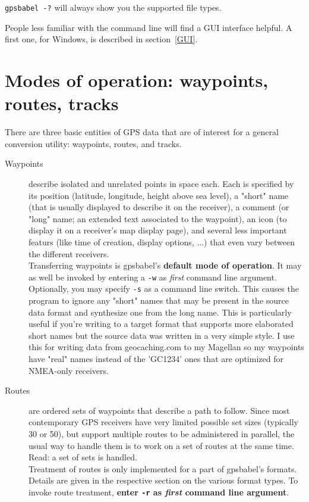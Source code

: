 \documentclass[12pt]{article}
\newcommand{\gpsbabel}{{\sc gpsbabel}}
\begin{document}
\bigskip

{\tt \small gpsbabel -?} will always show you the supported file types.

\bigskip

People less familiar with the command line will find a GUI interface helpful. A first one, for Windows, is described in section~\ref{GUI}.



\section{Modes of operation: waypoints, routes, tracks}

There are three basic entities of GPS data that are of interest for a general conversion utility: waypoints, routes, and tracks.

\begin{description}

\item[Waypoints] describe isolated and unrelated points in space each. Each is specified by its position (latitude, longitude, height above sea level), a "short" name (that is usually displayed to describe it on the receiver), a comment (or "long" name; an extended text associated to the waypoint), an icon (to display it on a receiver's map display page), and several less important featurs (like time of creation, display options, ...) that even vary between the different receivers.\\
Transferring waypoints is \gpsbabel 's {\bfseries default mode of operation}. It may as well be invoked by entering a {\tt -w} as {\em first} command line argument.\\
Optionally, you may specify {\tt -s} as a command line switch.  This causes the program to ignore any "short" names that may be present in the source data format and synthesize one from the long name.  This is particularly useful if you're writing to a target format that 
supports more elaborated short names but the source data was written in a very simple style.  I use this for writing data from geocaching.com to my Magellan so my waypoints have "real" names instead of the 'GC1234' ones that are optimized for NMEA-only 
receivers.

\item[Routes] are ordered sets of waypoints that describe a path to follow. Since most contemporary GPS receivers have very limited possible set sizes (typically 30 or 50), but support multiple routes to be administered in parallel, the usual way to handle them is to work on a set of routes at the same time. Read: a set of sets is handled.\\
Treatment of routes is only implemented for a part of \gpsbabel 's formats. Details are given in the respective section on the various format types. To invoke route treatment, {\bfseries enter {\tt -r} as {\em first} command line argument}.


\end{description}
\end{document}
